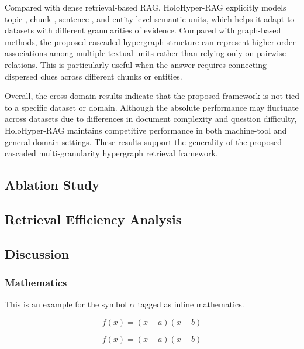 \documentclass[preprint,12pt]{elsarticle}
\begin{document}
Compared with dense retrieval-based RAG, HoloHyper-RAG explicitly models topic-, chunk-, sentence-, and entity-level semantic units, which helps it adapt to datasets with different granularities of evidence. Compared with graph-based methods, the proposed cascaded hypergraph structure can represent higher-order associations among multiple textual units rather than relying only on pairwise relations. This is particularly useful when the answer requires connecting dispersed clues across different chunks or entities.

Overall, the cross-domain results indicate that the proposed framework is not tied to a specific dataset or domain. Although the absolute performance may fluctuate across datasets due to differences in document complexity and question difficulty, HoloHyper-RAG maintains competitive performance in both machine-tool and general-domain settings. These results support the generality of the proposed cascaded multi-granularity hypergraph retrieval framework.
\subsection{Ablation Study}

\subsection{Retrieval Efficiency Analysis}

\subsection{Discussion}

\subsubsection{Mathematics}
This is an example for the symbol $\alpha$ tagged as inline mathematics.

\begin{equation}
f(x) = (x+a)(x+b)
\end{equation}

\begin{equation*}
f(x) = (x+a)(x+b)
\end{equation*}
\end{document}
